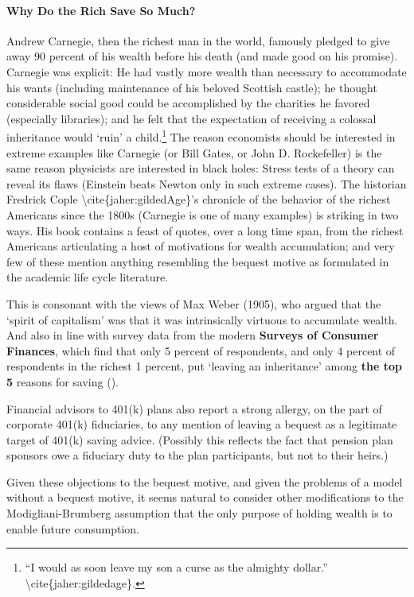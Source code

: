 \documentclass{article}
\begin{document}
\paragraph{Why Do the Rich Save So Much?}

Andrew Carnegie, then the richest man in the world, famously pledged to give away 90 percent of his wealth before his death (and made good on his promise). Carnegie was explicit: He had vastly more wealth than necessary to accommodate his wants (including maintenance of his beloved Scottish castle); he thought considerable social good could be accomplished by the charities he favored (especially libraries); and he felt that the expectation of receiving a colossal inheritance would `ruin' a child.\footnote{``I would as soon leave my son a curse as the almighty dollar.'' {\textbackslash}cite\{jaher:gildedage\}.} The reason economists should be interested in extreme examples like Carnegie (or Bill Gates, or John D. Rockefeller) is the same reason physicists are interested in black holes: Stress tests of a theory can reveal its flaws (Einstein beats Newton only in such extreme cases). The historian Fredrick Cople {\textbackslash}cite\{jaher:gildedAge\}'s chronicle of the behavior of the richest Americans since the 1800s (Carnegie is one of many examples) is striking in two ways. His book contains a feast of quotes, over a long time span, from the richest Americans articulating a host of motivations for wealth accumulation; and very few of these mention anything resembling the bequest motive as formulated in the academic life cycle literature.

This is consonant with the views of Max Weber (1905), who argued that the `spirit of capitalism' was that it was intrinsically virtuous to accumulate wealth. And also in line with survey data from the modern \textbf{Surveys of Consumer Finances}, which find that only 5 percent of respondents, and only 4 percent of respondents in the richest 1 percent, put `leaving an inheritance' among \textbf{the top 5} reasons for saving (\cite{Carroll1998d}).

Financial advisors to 401(k) plans also report a strong allergy, on the part of corporate 401(k) fiduciaries, to any mention of leaving a bequest as a legitimate target of 401(k) saving advice. (Possibly this reflects the fact that pension plan sponsors owe a fiduciary duty to the plan participants, but not to their heirs.)


Given these objections to the bequest motive, and given the problems of a model without a bequest motive, it seems natural to consider other modifications to the Modigliani-Brumberg assumption that the only purpose of holding wealth is to enable future consumption.
\end{document}
